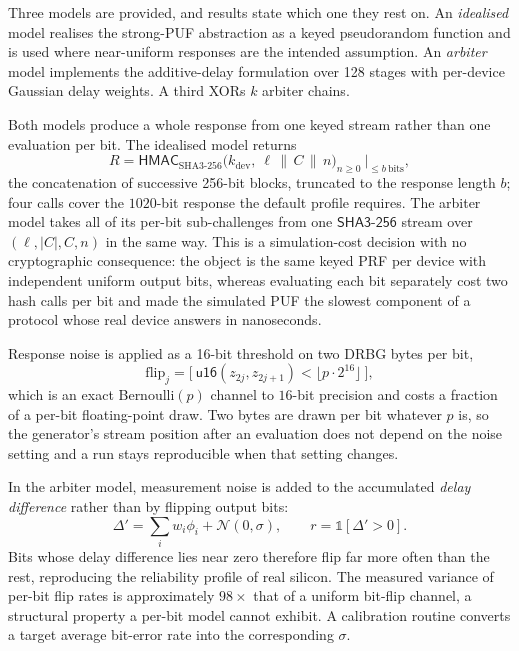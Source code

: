 \documentclass[11pt,a4paper]{article}
\begin{document}
Three models are provided, and results state which one they rest on. An
\emph{idealised} model realises the strong-PUF abstraction as a keyed
pseudorandom function and is used where near-uniform responses are the intended
assumption. An \emph{arbiter} model implements the additive-delay formulation over
128 stages with per-device Gaussian delay weights. A third XORs $k$ arbiter chains.

Both models produce a whole response from one keyed stream rather than one
evaluation per bit. The idealised model returns
%
\begin{equation}
R = \mathsf{HMAC}_{\text{SHA3-256}}\big(k_{\text{dev}},\ \ell \,\|\, C \,\|\, n\big)_{n \ge 0}
    \ \big|_{\le b\ \text{bits}},
\label{eq:puf_stream}
\end{equation}
%
the concatenation of successive 256-bit blocks, truncated to the response length
$b$; four calls cover the $1020$-bit response the default profile requires. The
arbiter model takes all of its per-bit sub-challenges from one
$\mathsf{SHA3\text{-}256}$ stream over $(\ell,|C|,C,n)$ in the same way. This is a
simulation-cost decision with no cryptographic consequence: the object is the same
keyed PRF per device with independent uniform output bits, whereas evaluating each
bit separately cost two hash calls per bit and made the simulated PUF the slowest
component of a protocol whose real device answers in nanoseconds.

Response noise is applied as a 16-bit threshold on two DRBG bytes per bit,
\begin{equation}
\text{flip}_j = \big[\ \mathsf{u16}(z_{2j}, z_{2j+1}) < \lfloor p \cdot 2^{16} \rfloor\ \big],
\end{equation}
which is an exact Bernoulli$(p)$ channel to $16$-bit precision and costs a
fraction of a per-bit floating-point draw. Two bytes are drawn per bit whatever
$p$ is, so the generator's stream position after an evaluation does not depend on
the noise setting and a run stays reproducible when that setting changes.

In the arbiter model, measurement noise is added to the accumulated \emph{delay
difference} rather than by flipping output bits:
%
\begin{equation}
\Delta' = \sum_{i} w_i \phi_i + \mathcal{N}(0,\sigma), \qquad
r = \mathbb{1}[\Delta' > 0].
\end{equation}
%
Bits whose delay difference lies near zero therefore flip far more often than the
rest, reproducing the reliability profile of real silicon. The measured variance of
per-bit flip rates is approximately $98\times$ that of a uniform bit-flip channel,
a structural property a per-bit model cannot exhibit. A calibration routine
converts a target average bit-error rate into the corresponding $\sigma$.
\end{document}
